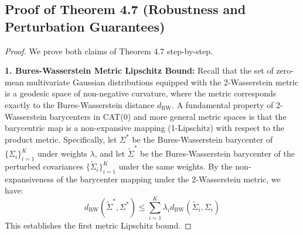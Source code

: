 \documentclass{article}
\theoremstyle{plain}
\theoremstyle{definition}
\theoremstyle{remark}
\begin{document}
\subsection{Proof of Theorem 4.7 (Robustness and Perturbation Guarantees)}
\label{appendix:proof-robustness}
\begin{proof}
We prove both claims of Theorem 4.7 step-by-step.

\textbf{1. Bures-Wasserstein Metric Lipschitz Bound:}
Recall that the set of zero-mean multivariate Gaussian distributions equipped with the 2-Wasserstein metric is a geodesic space of non-negative curvature, where the metric corresponds exactly to the Bures-Wasserstein distance $d_{\text{BW}}$.
A fundamental property of 2-Wasserstein barycenters in CAT(0) and more general metric spaces is that the barycentric map is a non-expansive mapping (1-Lipschitz) with respect to the product metric.
Specifically, let $\Sigma^*$ be the Bures-Wasserstein barycenter of $\{\Sigma_i\}_{i=1}^K$ under weights $\lambda$, and let $\tilde{\Sigma}^*$ be the Bures-Wasserstein barycenter of the perturbed covariances $\{\tilde{\Sigma}_i\}_{i=1}^K$ under the same weights.
By the non-expansiveness of the barycenter mapping under the 2-Wasserstein metric, we have:
\begin{equation}
  d_{\text{BW}}(\tilde{\Sigma}^*, \Sigma^*) \le \sum_{i=1}^K \lambda_i d_{\text{BW}}(\tilde{\Sigma}_i, \Sigma_i)
\end{equation}
This establishes the first metric Lipschitz bound.


\end{proof}
\end{document}
